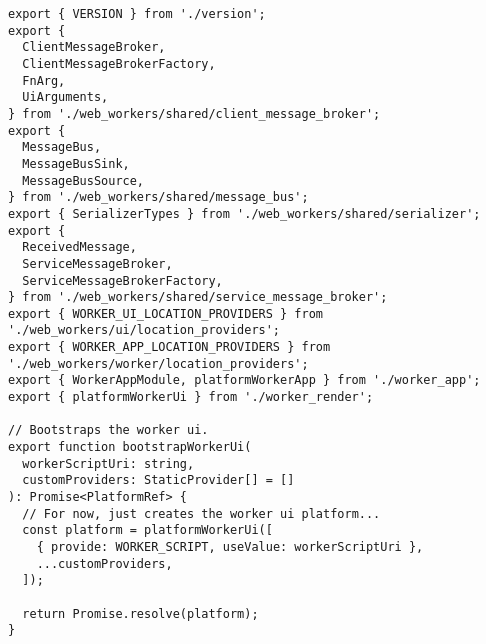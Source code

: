 \begin{verbatim}
export { VERSION } from './version';
export {
  ClientMessageBroker,
  ClientMessageBrokerFactory,
  FnArg,
  UiArguments,
} from './web_workers/shared/client_message_broker';
export {
  MessageBus,
  MessageBusSink,
  MessageBusSource,
} from './web_workers/shared/message_bus';
export { SerializerTypes } from './web_workers/shared/serializer';
export {
  ReceivedMessage,
  ServiceMessageBroker,
  ServiceMessageBrokerFactory,
} from './web_workers/shared/service_message_broker';
export { WORKER_UI_LOCATION_PROVIDERS } from './web_workers/ui/location_providers';
export { WORKER_APP_LOCATION_PROVIDERS } from './web_workers/worker/location_providers';
export { WorkerAppModule, platformWorkerApp } from './worker_app';
export { platformWorkerUi } from './worker_render';

// Bootstraps the worker ui.
export function bootstrapWorkerUi(
  workerScriptUri: string,
  customProviders: StaticProvider[] = []
): Promise<PlatformRef> {
  // For now, just creates the worker ui platform...
  const platform = platformWorkerUi([
    { provide: WORKER_SCRIPT, useValue: workerScriptUri },
    ...customProviders,
  ]);

  return Promise.resolve(platform);
}
\end{verbatim}
